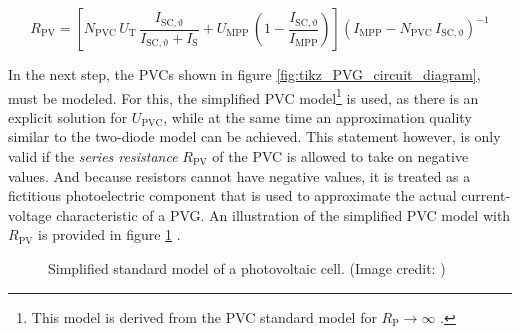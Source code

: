 \begin{center}
	\begin{equation} \label{eq:r_pv}
		R_{\mathrm{PV}} = \left[ N_{\mathrm{PVC}} \, U_{\mathrm{T}} \, \frac{I_{\mathrm{SC, \vartheta}}}{I_{\mathrm{SC, \vartheta}} + I_{\mathrm{S}}} + U_{\mathrm{MPP}} \, \left(1 - \frac{I_{\mathrm{SC, \vartheta}}}{I_{\mathrm{MPP}}} \right) \right] \left( I_{\mathrm{MPP}} - N_{\mathrm{PVC}} \, I_{\mathrm{SC, \vartheta}}\right)^{-1}
	\end{equation}
\end{center}









In the next step, the PVCs shown in figure \ref{fig:tikz_PVG_circuit_diagram}, must be modeled. For this, the simplified PVC model\footnote{This model is derived from the PVC standard model for $R_{\mathrm{P}} \to \infty$ \cite{Mertens:2015, Wagner:2018}.} is used, as there is an explicit solution for $U_{\mathrm{PVC}}$, while at the same time an approximation quality similar to the two-diode model can be achieved. This statement however, is only valid if the \emph{series resistance} $R_{\mathrm{PV}}$ of the PVC is allowed to take on negative values. And because resistors cannot have negative values, it is treated as a fictitious photoelectric component that is used to approximate the actual current-voltage characteristic of a PVG. An illustration of the simplified PVC model with $R_{\mathrm{PV}}$ is provided in figure \ref{fig:tikz_PVC_simplified} \cite{Wagner:2018}.

\begin{figure}[h!]
	\centering
	
	\caption{Simplified standard model of a photovoltaic cell. (Image credit: \cite{Mertens:2015, Wagner:2018})}
	\label{fig:tikz_PVC_simplified}
\end{figure}

